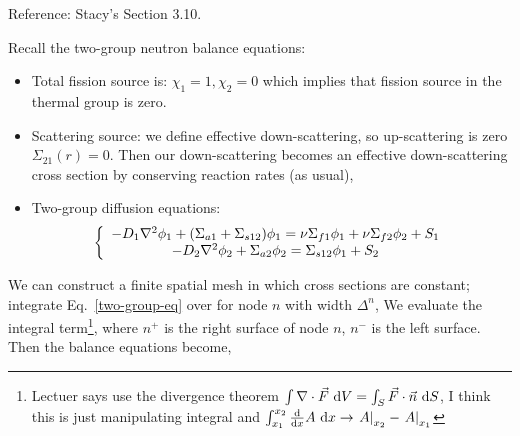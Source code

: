\documentclass{school-22.211-notes}
\date{April 4, 2012}
\begin{document}
\maketitle

Reference: Stacy's Section 3.10. 

Recall the two-group neutron balance equations:
\begin{itemize}
\item Total fission source is: 
  $\chi_1 = 1, \chi_2 = 0$ which implies that fission source in the thermal group is zero.
\item Scattering source: we define effective down-scattering, so up-scattering is zero $\Sigma_{21}(r) = 0$. Then our down-scattering becomes an effective down-scattering cross section by conserving reaction rates (as usual), 

\item Two-group diffusion equations: 
  \begin{align}
    \left\{ \begin{array}{c}
      - D_1 \nabla^2 \phi_1 + (\Sigma_{a1} + \Sigma_{s12}) \phi_1 = \nu \Sigma_{f1} \phi_1 + \nu \Sigma_{f2} \phi_2 + S_1  \\
      - D_2 \nabla^2 \phi_2 + \Sigma_{a2} \phi_2 = \Sigma_{s12} \phi_1 + S_2
    \end{array} \right. \label{two-group-eq}
  \end{align} 
\end{itemize}

We can construct a finite spatial mesh in which cross sections are constant; integrate Eq.~\ref{two-group-eq} over for node $n$ with width $\Delta^n$,
We evaluate the integral term\footnote{Lectuer says use the divergence theorem $\int \nabla \cdot \vec{F} \mbox{ }\mathrm{d} V = \int_S \vec{F} \cdot \vec{n} \mbox{ }\mathrm{d} S$, I think this is just manipulating integral and $\int_{x_1}^{x_2} \frac{\mathrm{d}}{\mathrm{d}x} A \mbox{ }\mathrm{d} x \to \left. A \right|_{x_2} - \left. A \right|_{x_1}$}, 
where $n^+$ is the right surface of node $n$, $n^-$ is the left surface. Then the balance equations become,
\end{document}
